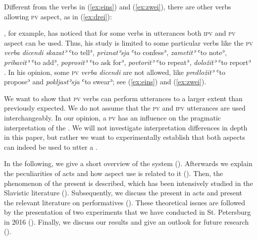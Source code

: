\documentclass[output=paper,colorlinks,citecolor=brown,newtxmath,hidelinks]{langscibook}
\begin{document}
\noindent Different from the verbs in (\ref{ex:eins}) and (\ref{ex:zwei}), there are other  verbs allowing \textsc{pv} aspect, as in (\ref{ex:drei}):

\ea\label{ex:drei}
            \z
\z

\noindent\citet{Dickey2000}, for example, has noticed that for some  verbs in  utterances both \textsc{ipv} and \textsc{pv} aspect can be used. Thus, his study is limited to some particular verbs like the \textsc{pv} \textit{verba dicendi} \textit{skazatʾ} ʿto tellʾ, \textit{priznatʾsja} ʿto confessʾ, \textit{zametitʾ} ʿto noteʾ, \textit{pribavitʾ} ʿto addʾ, \textit{poprositʾ} ʿto ask forʾ, \textit{povtoritʾ} ʿto repeatʾ, \textit{doložitʾ} ʿto reportʾ \citep[179]{Dickey2000}. In his opinion, some \textsc{pv} \textit{verba dicendi} are not allowed, like \textit{predložitʾ} ʿto proposeʾ and \textit{pokljastʾsja} ʿto swearʾ; see (\ref{ex:eins}) and (\ref{ex:zwei}).

We want to show that \textsc{pv}  verbs can perform  utterances to a larger extent than previously expected. We do not assume that the \textsc{pv} and \textsc{ipv}  utterances are used interchangeably. In our opinion, a \textsc{pv}  has an influence on the pragmatic interpretation of the . We will not investigate interpretation differences in depth in this paper, but rather we want to experimentally establish that both aspects can indeed be used to utter a . 

In the following, we give a short overview of the   system (). Afterwards we explain the peculiarities of  acts and how aspect use is related to it (). Then, the phenomenon of the present  is described, which has been intensively studied in the Slavistic literature (). Subsequently, we discuss the present  in  acts and present the relevant literature on  performatives (). These theoretical issues are followed by the presentation of two experiments that we have conducted in St. Petersburg in 2016 (). Finally, we discuss our results and give an outlook for future research ().
\end{document}
